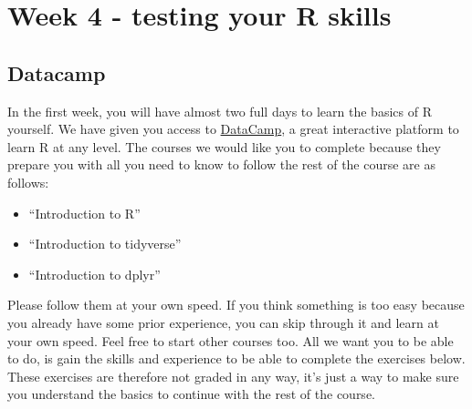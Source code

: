 \documentclass[
  letterpaper,
  DIV=11,
  numbers=noendperiod]{scrreprt}
\providecommand{\tightlist}{%
  \setlength{\itemsep}{0pt}\setlength{\parskip}{0pt}}\usepackage{longtable,booktabs,array}
\begin{document}

\chapter{Week 4 - testing your R
skills}\label{week-4---testing-your-r-skills}

\section{Datacamp}\label{datacamp}

In the first week, you will have almost two full days to learn the
basics of R yourself. We have given you access to
\href{https://datacamp.com/}{DataCamp}, a great interactive platform to
learn R at any level. The courses we would like you to complete because
they prepare you with all you need to know to follow the rest of the
course are as follows:

\begin{itemize}
\tightlist
\item
  ``Introduction to R''
\item
  ``Introduction to tidyverse''
\item
  ``Introduction to dplyr''
\end{itemize}

Please follow them at your own speed. If you think something is too easy
because you already have some prior experience, you can skip through it
and learn at your own speed. Feel free to start other courses too. All
we want you to be able to do, is gain the skills and experience to be
able to complete the exercises below. These exercises are therefore not
graded in any way, it's just a way to make sure you understand the
basics to continue with the rest of the course.
\end{document}
